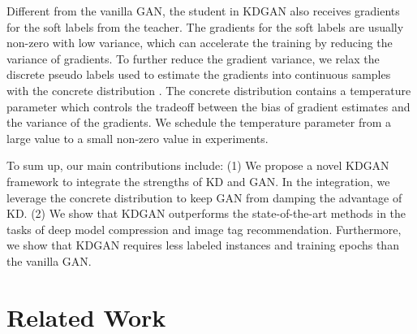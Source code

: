 \documentclass{article}
\newcommand{\bo}[1]{}
\newcommand{\bo}[1]{{\color{cyan}[Bo: #1]}}
\begin{document}
Different from the vanilla GAN, the student in KDGAN also receives gradients for the soft labels from the teacher.
The gradients for the soft labels are usually non-zero with low variance, which can accelerate the training by reducing the variance of gradients.
To further reduce the gradient variance, we relax the discrete pseudo labels used to estimate the gradients into continuous samples with the concrete distribution \cite{jang2016categorical,maddison2016concrete}.
The concrete distribution contains a temperature parameter which controls the tradeoff between the bias of gradient estimates and the variance of the gradients.
We schedule the temperature parameter from a large value to a small non-zero value in experiments.

To sum up, our main contributions include:
(1) We propose a novel KDGAN framework to integrate the strengths of KD and GAN.
In the integration, we leverage the concrete distribution \bo{not clear} to keep GAN from damping the advantage of KD.
(2) We show that KDGAN outperforms the state-of-the-art methods in the tasks of deep model compression and image tag recommendation.
Furthermore, we show that KDGAN requires less labeled instances and training epochs than the vanilla GAN.


\section{Related Work}

\end{document}
